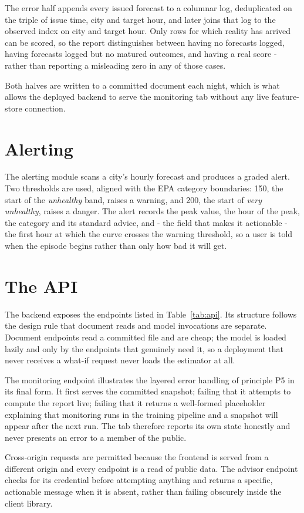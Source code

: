 The error half appends every issued forecast to a columnar log, deduplicated
on the triple of issue time, city and target hour, and later joins that log to the
observed index on city and target hour. Only rows for which reality has arrived
can be scored, so the report distinguishes between having no forecasts logged,
having forecasts logged but no matured outcomes, and having a real score -
rather than reporting a misleading zero in any of those cases.

Both halves are written to a committed document each night, which is what allows
the deployed backend to serve the monitoring tab without any live feature-store
connection.

\section{Alerting}
The alerting module scans a city's hourly forecast and produces a graded alert.
Two thresholds are used, aligned with the EPA category boundaries: 150, the start
of the \emph{unhealthy} band, raises a warning, and 200, the start of \emph{very
unhealthy}, raises a danger. The alert records the peak value, the hour of the
peak, the category and its standard advice, and - the field that makes it
actionable - the first hour at which the curve crosses the warning threshold, so
a user is told when the episode begins rather than only how bad it will get.

\section{The API}
The backend exposes the endpoints listed in Table~\ref{tab:api}. Its structure
follows the design rule that document reads and model invocations are separate.
Document endpoints read a committed file and are cheap; the model is loaded lazily
and only by the endpoints that genuinely need it, so a deployment that never
receives a what-if request never loads the estimator at all.

The monitoring endpoint illustrates the layered error handling of principle P5 in
its final form. It first serves the committed snapshot; failing that it attempts
to compute the report live; failing that it returns a well-formed placeholder
explaining that monitoring runs in the training pipeline and a snapshot will
appear after the next run. The tab therefore reports its own state honestly and
never presents an error to a member of the public.

Cross-origin requests are permitted because the frontend is served from a
different origin and every endpoint is a read of public data. The advisor endpoint
checks for its credential before attempting anything and returns a specific,
actionable message when it is absent, rather than failing obscurely inside the
client library.

